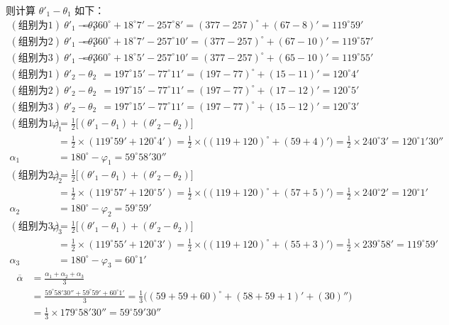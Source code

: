 \documentclass[UTF8]{ctexart}
\begin{document}
则计算 $\theta'_1 - \theta_1$ 如下：
\begin{align*}
    (\text{组别为1}) \ \theta'_1 - \theta_1 &= 360^{\circ} + 18^{\circ}7' - 257^{\circ}8' = (377 - 257)^{\circ} + (67 - 8)' = 119^{\circ}59' \\
    (\text{组别为2}) \ \theta'_1 - \theta_1 &= 360^{\circ} + 18^{\circ}7' - 257^{\circ}10' = (377 - 257)^{\circ} +(67 - 10)' = 119^{\circ}57'
    \\
    (\text{组别为3}) \ \theta'_1 - \theta_1 &= 360^{\circ} + 18^{\circ}5' - 257^{\circ}10' = (377 - 257)^{\circ} + (65 - 10)' = 119^{\circ}55'
\end{align*}
\begin{align*}
    (\text{组别为1}) \ \theta'_2 - \theta_2 &=   197^{\circ}15' - 77^{\circ}11' = (197 - 77)^{\circ} + (15 - 11)' = 120^{\circ}4' \\
    (\text{组别为2})\ \theta'_2 - \theta_2 &=   197^{\circ}15' - 77^{\circ}11' = (197 - 77)^{\circ} + (17 - 12)' = 120^{\circ}5' \\
    (\text{组别为3}) \ \theta'_2 - \theta_2 &=   197^{\circ}15' - 77^{\circ}11' = (197 - 77)^{\circ} + (15 - 12)' = 120^{\circ}3' 
\end{align*}
\begin{align*}
    (\text{组别为1}) \ \varphi_1 &= \frac{1}{2} \big[ (\theta'_1 - \theta_1) + (\theta'_2 - \theta_2) \big]   \\
     &= \frac{1}{2} \times ( 119^{\circ}59' + 120^{\circ}4') =  \frac{1}{2} \times \big( ( 119 + 120)^{\circ} + ( 59 + 4)'   \big)  = \frac{1}{2} \times 240^{\circ}3' = 120^{\circ}1'30''\\
     \alpha_1 &= 180^{\circ} - \varphi_1 = 59^{\circ}58'30'' \\
    (\text{组别为2})\ \varphi_2 &= \frac{1}{2} \big[ (\theta'_1 - \theta_1) + (\theta'_2 - \theta_2) \big]   \\
     &= \frac{1}{2} \times ( 119^{\circ}57' + 120^{\circ}5') =  \frac{1}{2} \times \big( ( 119 + 120)^{\circ} + ( 57 + 5)'   \big)  = \frac{1}{2} \times 240^{\circ}2' = 120^{\circ}1'\\
     \alpha_2 &= 180^{\circ} - \varphi_2 = 59^{\circ}59' \\
    (\text{组别为3})\ \varphi_3 &= \frac{1}{2} \big[ (\theta'_1 - \theta_1) + (\theta'_2 - \theta_2) \big]   \\
     &= \frac{1}{2} \times ( 119^{\circ}55' + 120^{\circ}3') =  \frac{1}{2} \times \big( ( 119 + 120)^{\circ} + ( 55 + 3)'   \big)  = \frac{1}{2} \times 239^{\circ}58' = 119^{\circ}59' \\
      \alpha_3 &= 180^{\circ} - \varphi_3 = 60^{\circ}1' 
\end{align*}
\begin{align*}
    \overline{\alpha} &= \frac{\alpha_1 + \alpha_2 + \alpha_3}{3}  \\
    &= \frac{59^{\circ}58'30'' +  59^{\circ}59' + 60^{\circ}1'}{3} = \frac{1}{3} \big( (59 + 59 + 60)^{\circ} + (58 + 59 + 1)'+ (30)''  \big)  \\
    &= \frac{1}{3} \times 179^{\circ}58'30'' = 59^{\circ}59'30''
\end{align*}
\end{document}

